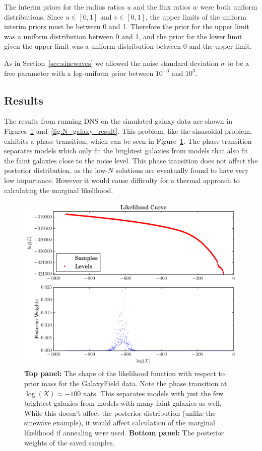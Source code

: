 \documentclass[letterpaper, 11pt]{article}
\begin{document}
The interim priors for the radius ratios $u$ and the flux ratios $w$ were both
uniform distributions. Since $u \in [0,1]$ and $v \in [0,1]$, the upper limits
of the uniform interim priors must be between 0 and 1. Therefore the prior
for the upper limit was a uniform distribution between 0 and 1, and the prior
for the lower limit given the upper limit was a uniform distribution between 0
and the upper limit.

As in Section~\ref{sec:sinewaves}
we allowed the noise standard deviation $\sigma$ to be a free parameter with
a log-uniform prior between $10^{-3}$ and $10^3$.

\subsection{Results}
The results from running DNS on the simulated galaxy data are shown in
Figures~\ref{fig:galaxyfield_likelihood} and~\ref{fig:N_galaxy_result}.
This problem, like the sinusoidal problem, exhibits a phase transition, which
can be seen in Figure~\ref{fig:galaxyfield_likelihood}. The phase transition
separates models which only fit the brightest galaxies from models that
also fit the faint galaxies close to the noise level. This phase transition
does not affect the posterior distribution, as the low-$N$ solutions are
eventually found to have very low importance. However it would cause difficulty
for a thermal approach to calculating the marginal likelihood.

\begin{figure}
\begin{center}
\includegraphics[scale=0.5]{galaxyfield_likelihood.pdf}
\caption{{\bf Top panel: }
The shape of the likelihood function with respect to prior mass for the
GalaxyField data. Note the phase
transition at $\log(X) \approx -100$ nats. This separates models with just
the few brightest galaxies from models with many faint galaxies as well.
While this doesn't affect the
posterior distribution (unlike the sinewave example), it would affect calculation
of the marginal likelihood if annealing were used.
{\bf Bottom panel: }The posterior weights of the saved samples.
\label{fig:galaxyfield_likelihood}}
\end{center}
\end{figure}
\end{document}
